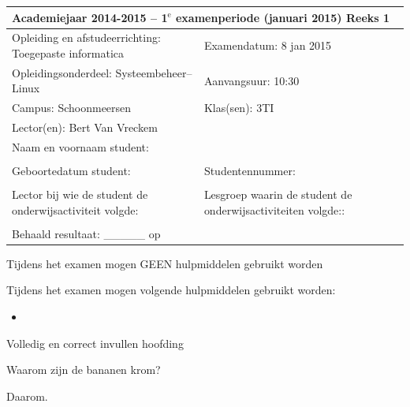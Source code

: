 \documentclass{exam}
\newif\ifsolution %
\newcommand{\academiejaar}{2014-2015}   %
\newcommand{\examenperiode}{1$^{\mbox{e}}$}         %
\newcommand{\examenmaand}{januari 2015} %
\newcommand{\examendatum}{8 jan 2015}
\newcommand{\examenuur}{10:30}
\newcommand{\opleiding}{Toegepaste informatica}
\newcommand{\olod}{Systeembeheer--Linux} %
\newcommand{\reeks}{Reeks 1}            %
\newcommand{\campus}{Schoonmeersen}      %
\newcommand{\klassen}{3TI}               %
\newcommand{\lectoren}{Bert Van Vreckem}
\begin{document}
\ifsolution
\begin{center}
\LARGE{\textbf{VOORBEELDOPLOSSING}}
\end{center}
\fi

\begin{tabular}{|l|l|l|}
\hline
\multicolumn{3}{|p{.95\textwidth}|}{\textbf{Academiejaar \academiejaar{} -- \examenperiode{} examenperiode (\examenmaand) \hfill \reeks}}\tabularnewline
\hline
\multicolumn{2}{|p{.65\textwidth}|}{Opleiding en afstudeerrichting: \opleiding} & Examendatum: \examendatum \tabularnewline
\multicolumn{2}{|p{.65\textwidth}|}{Opleidingsonderdeel: \olod} & Aanvangsuur: \examenuur \tabularnewline
\multicolumn{2}{|p{.65\textwidth}|}{Campus: \campus{}} & Klas(sen): \klassen \tabularnewline
\multicolumn{2}{|p{.65\textwidth}|}{Lector(en): \lectoren} &  \tabularnewline
\hline
\multicolumn{3}{|l|}{Naam en voornaam student:}\tabularnewline
\multicolumn{3}{|l|}{}\tabularnewline
\hline
Geboortedatum student: & \multicolumn{2}{|p{.4\textwidth}|}{Studentennummer: }\tabularnewline
 & \multicolumn{2}{|p{.4\textwidth}|}{}\tabularnewline
\hline
Lector bij wie de student de onderwijsactiviteit volgde: \enspace \hrulefill & \multicolumn{2}{|p{.4\textwidth}|}{Lesgroep waarin de student de onderwijsactiviteiten volgde:: }\tabularnewline
 & \multicolumn{2}{|p{.4\textwidth}|}{}\tabularnewline
\hline
\multicolumn{3}{|l|}{Behaald resultaat: \_\_\_\_\_ op \numpoints{}}\tabularnewline
\hline
\end{tabular}

\vspace{.3cm}

\XBox Tijdens het examen mogen GEEN hulpmiddelen gebruikt worden

\Square Tijdens het examen mogen volgende hulpmiddelen gebruikt worden:
\begin{itemize}
\item
\end{itemize}

\hrulefill

\begin{questions}

\framedsolutions
\ifsolution
  \printanswers
\else
  \noprintanswers
\fi

  
\question[1] Volledig en correct invullen hoofding

\question[9] Waarom zijn de bananen krom?
  
\begin{solutionordottedlines}[3cm]
Daarom.
\end{solutionordottedlines}

\end{questions}
\end{document}

